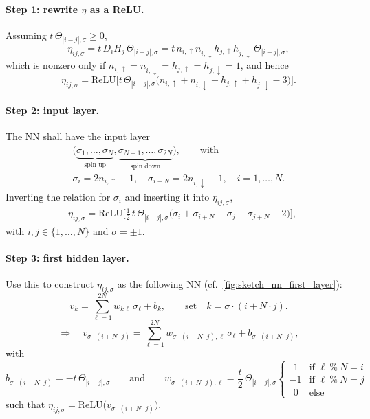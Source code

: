 \documentclass[../../main.tex]{subfiles}
\begin{document}
\paragraph{Step 1: rewrite $\eta$ as a ReLU.}
Assuming $t\,\Theta_{|i-j|,\sigma}\ge0$,
\begin{equation*}
\eta_{ij,\sigma}=t\,D_iH_j\,\Theta_{|i-j|,\sigma}
=t\,n_{i,\uparrow}n_{i,\downarrow}h_{j,\uparrow}h_{j,\downarrow}\,\Theta_{|i-j|,\sigma},
\end{equation*}
which is nonzero only if
$n_{i,\uparrow}=n_{i,\downarrow}=h_{j,\uparrow}=h_{j,\downarrow}=1$, and hence
\begin{equation*}
\eta_{ij,\sigma}=\mathrm{ReLU}\Big[t\,\Theta_{|i-j|,\sigma}
\big(n_{i,\uparrow}+n_{i,\downarrow}+h_{j,\uparrow}+h_{j,\downarrow}-3\big)\Big].
\end{equation*}

\paragraph{Step 2: input layer.}
The NN shall have the input layer
\begin{align*}
\big(\underbrace{\sigma_1,\dots,\sigma_N}_{\text{spin up}},
\underbrace{\sigma_{N+1},\dots,\sigma_{2N}}_{\text{spin down}}\big),
\qquad \text{with} \\
\sigma_i=2n_{i,\uparrow}-1,\quad \sigma_{i+N}=2n_{i,\downarrow}-1,
\quad i=1,\dots,N .
\end{align*}
Inverting the relation for $\sigma_i$ and inserting it into $\eta_{ij,\sigma}$,
\begin{align*}
&\eta_{ij,\sigma}=\mathrm{ReLU}\Big[\tfrac{1}{2}\,t\,\Theta_{|i-j|,\sigma}
\big(\sigma_i+\sigma_{i+N}-\sigma_j-\sigma_{j+N}-2\big)\Big],  
\end{align*}
with $i,j\in\{1,\dots,N\}$ and $\sigma=\pm1$.

\paragraph{Step 3: first hidden layer.}
Use this to construct $\eta_{ij,\sigma}$ as the following NN (cf.\ \cref{fig:sketch_nn_first_layer}):
\begin{equation}
v_k=\sum_{\ell=1}^{2N}w_{k\ell}\,\sigma_\ell+b_k,
\qquad\text{set}\quad k=\sigma\cdot(i+N\cdot j).
\end{equation}
\begin{equation}
\Rightarrow\quad
v_{\sigma\cdot(i+N\cdot j)}=\sum_{\ell=1}^{2N}w_{\sigma\cdot(i+N\cdot j),\ell}\,
\sigma_\ell+b_{\sigma\cdot(i+N\cdot j)},
\end{equation}
with
\begin{equation}
b_{\sigma\cdot(i+N\cdot j)}=-t\,\Theta_{|i-j|,\sigma}
\qquad\text{and}\qquad
w_{\sigma\cdot(i+N\cdot j),\ell}=\frac{t}{2}\,\Theta_{|i-j|,\sigma}
\begin{cases}
\ \ 1 & \text{if }\ell\ \%\ N=i\\
-1 & \text{if }\ell\ \%\ N=j\\
\ \ 0 & \text{else}
\end{cases}
\end{equation}
such that $\eta_{ij,\sigma}=\mathrm{ReLU}\big(v_{\sigma\cdot(i+N\cdot j)}\big)$.
\end{document}
